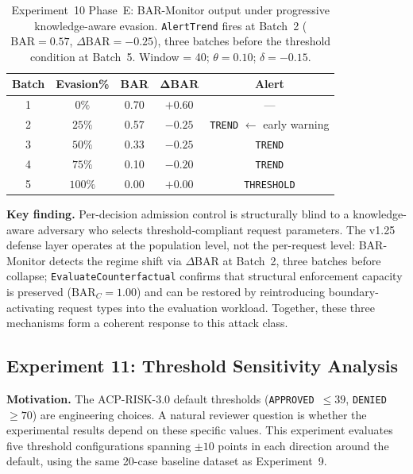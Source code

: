 \documentclass[11pt]{article}
\theoremstyle{definition}
\begin{document}
\begin{table}[h!]
\centering
\small
\begin{tabular}{@{}ccccc@{}}
\toprule
\textbf{Batch} & \textbf{Evasion\%} & \textbf{BAR} & $\boldsymbol{\Delta}\mathbf{BAR}$ & \textbf{Alert} \\
\midrule
1 & $0\%$   & 0.70 & $+0.60$ & --- \\
2 & $25\%$  & 0.57 & $-0.25$ & \texttt{TREND} $\leftarrow$ early warning \\
3 & $50\%$  & 0.33 & $-0.25$ & \texttt{TREND} \\
4 & $75\%$  & 0.10 & $-0.20$ & \texttt{TREND} \\
5 & $100\%$ & 0.00 & $+0.00$ & \texttt{THRESHOLD} \\
\bottomrule
\end{tabular}
\caption{Experiment~10 Phase~E: BAR-Monitor output under progressive knowledge-aware
evasion. \texttt{AlertTrend} fires at Batch~2 ($\mathrm{BAR}=0.57$,
$\Delta\mathrm{BAR}=-0.25$), three batches before the threshold condition at Batch~5.
Window = 40; $\theta=0.10$; $\delta=-0.15$.}
\label{tab:exp10-phase-e}
\end{table}

\textbf{Key finding.}
Per-decision admission control is structurally blind to a knowledge-aware adversary
who selects threshold-compliant request parameters.
The v1.25 defense layer operates at the population level, not the per-request level:
BAR-Monitor detects the regime shift via $\Delta\mathrm{BAR}$ at Batch~2,
three batches before collapse;
\texttt{EvaluateCounterfactual} confirms that structural enforcement capacity is
preserved ($\mathrm{BAR}_C = 1.00$) and can be restored by reintroducing
boundary-activating request types into the evaluation workload.
Together, these three mechanisms form a coherent response to this attack class.

\subsection{Experiment 11: Threshold Sensitivity Analysis}
\label{sec:exp11}

\textbf{Motivation.}
The ACP-RISK-3.0 default thresholds (\texttt{APPROVED}~$\leq 39$,
\texttt{DENIED}~$\geq 70$) are engineering choices.
A natural reviewer question is whether the experimental results depend on
these specific values.
This experiment evaluates five threshold configurations spanning
$\pm 10$ points in each direction around the default,
using the same 20-case baseline dataset as Experiment~9.
\end{document}
